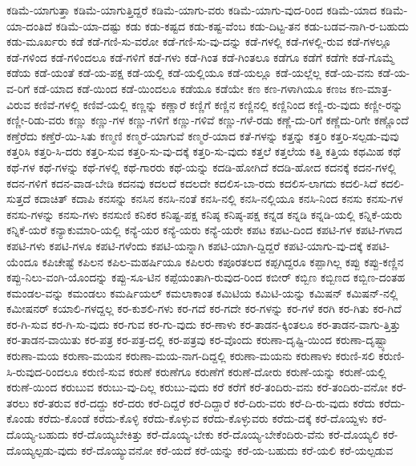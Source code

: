 {ಕಡಿಮೆ-ಯಾಗುತ್ತಾ
ಕಡಿಮೆ-ಯಾಗುತ್ತಿದ್ದರೆ
ಕಡಿಮೆ-ಯಾಗು-ವರು
ಕಡಿಮೆ-ಯಾಗು-ವುದ-ರಿಂದ
ಕಡಿಮೆ-ಯಾದ
ಕಡಿಮೆ-ಯಾ-ದಂತಿದೆ
ಕಡಿಮೆ-ಯಾ-ದಷ್ಟು
ಕಡು
ಕಡು-ಕಷ್ಟದ
ಕಡು-ಕಷ್ಟ-ವೆಂಬ
ಕಡು-ದಿಟ್ಟ-ತನ
ಕಡು-ಬಡವ-ನಾಗಿ-ರ-ಬಹುದು
ಕಡು-ಮೂರ್ಖರು
ಕಡೆ
ಕಡೆ-ಗಣಿ-ಸು-ವರೋ
ಕಡೆ-ಗಣಿ-ಸು-ವು-ದನ್ನು
ಕಡೆ-ಗಳಲ್ಲಿ
ಕಡೆ-ಗಳಲ್ಲಿ-ರುವ
ಕಡೆ-ಗಳಲ್ಲೂ
ಕಡೆ-ಗಳಿಂದ
ಕಡೆ-ಗಳಿಂದಲೂ
ಕಡೆ-ಗಳಿಗೆ
ಕಡೆ-ಗಳು
ಕಡೆ-ಗಿಂತ
ಕಡೆ-ಗಿಂತಲೂ
ಕಡೆಗೂ
ಕಡೆಗೆ
ಕಡೆಗೇ
ಕಡೆ-ಗೊಮ್ಮೆ
ಕಡೆಯ
ಕಡೆ-ಯಂತೆ
ಕಡೆ-ಯ-ಪಕ್ಷ
ಕಡೆ-ಯಲ್ಲಿ
ಕಡೆ-ಯಲ್ಲಿಯೂ
ಕಡೆ-ಯಲ್ಲೂ
ಕಡೆ-ಯಲ್ಲೆಲ್ಲ
ಕಡೆ-ಯ-ವನು
ಕಡೆ-ಯ-ವ-ರಿಗೆ
ಕಡೆ-ಯಾದ
ಕಡೆ-ಯಿಂದ
ಕಡೆ-ಯಿಂದಲೂ
ಕಡೆಯೂ
ಕಡೆಯೇ
ಕಣ
ಕಣ-ಗಳಾಗಿಯೂ
ಕಣಜ
ಕಣ-ಮಾತ್ರ-ವಿರುವ
ಕಣಿವೆ-ಗಳಲ್ಲಿ
ಕಣಿವೆ-ಯಲ್ಲಿ
ಕಣ್ಣನ್ನು
ಕಣ್ಣಾರೆ
ಕಣ್ಣಿಗೆ
ಕಣ್ಣಿನ
ಕಣ್ಣಿನಲ್ಲಿ
ಕಣ್ಣಿನಿಂದ
ಕಣ್ಣಿ-ರು-ವುದು
ಕಣ್ಣೀ-ರನ್ನು
ಕಣ್ಣೀ-ರಿಡು-ವರು
ಕಣ್ಣು
ಕಣ್ಣು-ಗಳ
ಕಣ್ಣು-ಗಳಿಗೆ
ಕಣ್ಣು-ಗಳಿವೆ
ಕಣ್ಣು-ಗಳೆ-ರಡು
ಕಣ್ಣೆ-ದು-ರಿಗೆ
ಕಣ್ಣೆದು-ರಿಗೇ
ಕಣ್ಣೊಂದೆ
ಕಣ್ತೆರೆದು
ಕಣ್ತೆರೆ-ಯಿ-ಸಿತು
ಕಣ್ಮಣಿ
ಕಣ್ಮರೆ-ಯಾಗುವೆ
ಕಣ್ಮರೆ-ಯಾದ
ಕತೆ-ಗಳನ್ನು
ಕತ್ತನ್ನು
ಕತ್ತರಿ
ಕತ್ತರಿ-ಸಲ್ಪಡು-ವುವು
ಕತ್ತರಿಸಿ
ಕತ್ತರಿ-ಸಿ-ದರು
ಕತ್ತರಿ-ಸುವ
ಕತ್ತರಿ-ಸು-ವು-ದಕ್ಕೆ
ಕತ್ತರಿ-ಸು-ವುದು
ಕತ್ತಲೆ
ಕತ್ತಲೆಯ
ಕತ್ತಿ
ಕತ್ತಿಯ
ಕಥಮಿಹ
ಕಥೆ
ಕಥೆ-ಗಳ
ಕಥೆ-ಗಳನ್ನು
ಕಥೆ-ಗಳಲ್ಲಿ
ಕಥೆ-ಗಾರರು
ಕಥೆ-ಯನ್ನು
ಕದಡಿ-ಹೋಗಿದೆ
ಕದಡಿ-ಹೋದ
ಕದನಕ್ಕೆ
ಕದನ-ಗಳಲ್ಲಿ
ಕದನ-ಗಳಿಗೆ
ಕದನ-ವಾಡ-ಬೇಡಿ
ಕದನವು
ಕದಲದೆ
ಕದಲದೇ
ಕದಲಿಸ-ಬಾ-ರದು
ಕದಲಿಸ-ಲಾಗದು
ಕದಲಿ-ಸಿದೆ
ಕದಲಿ-ಸುತ್ತದೆ
ಕದಾಚಿತ್
ಕದಾಪಿ
ಕನಸನ್ನು
ಕನಸಿನ
ಕನಸಿ-ನಂತೆ
ಕನಸಿ-ನಲ್ಲಿ
ಕನಸಿ-ನಲ್ಲಿಯೂ
ಕನಸಿ-ನಿಂದ
ಕನಸು
ಕನಸು-ಗಳ
ಕನಸು-ಗಳನ್ನು
ಕನಸು-ಗಳು
ಕನಸುಣಿ
ಕನಿಕರ
ಕನಿಷ್ಟ-ಪಕ್ಷ
ಕನಿಷ್ಠ
ಕನಿಷ್ಠ-ಪಕ್ಷ
ಕನ್ನಡ
ಕನ್ನಡಿ
ಕನ್ನಡಿ-ಯಲ್ಲಿ
ಕನ್ನಿಕೆ-ಯರು
ಕನ್ನಿಕೆ-ಯರೆ
ಕನ್ಯಾಕುಮಾರಿ-ಯಲ್ಲಿ
ಕನ್ಯೆ-ಯರ
ಕನ್ಯೆ-ಯರು
ಕನ್ಯೆ-ಯರೇ
ಕಪಟ
ಕಪಟ-ದಿಂದ
ಕಪಟಿ-ಗಳ
ಕಪಟಿ-ಗಳಾದ
ಕಪಟಿ-ಗಳು
ಕಪಟಿ-ಗಳೂ
ಕಪಟಿ-ಗಳೆಂದು
ಕಪಟಿ-ಯನ್ನಾಗಿ
ಕಪಟಿ-ಯಾಗಿ-ದ್ದಿದ್ದರೆ
ಕಪಟಿ-ಯಾಗು-ವು-ದಕ್ಕೆ
ಕಪಟಿ-ಯೆಂದೂ
ಕಪಿಚೇಷ್ಟೆ
ಕಪಿಲನ
ಕಪಿಲ-ಮಹರ್ಷಿಯೂ
ಕಪಿಲರು
ಕಪೂರತಲದ
ಕಪ್ಪಗಿದ್ದರೂ
ಕಪ್ಪಾಗಿಲ್ಲ
ಕಪ್ಪು
ಕಪ್ಪು-ಕಣ್ಣಿನ
ಕಪ್ಪು-ನಿಲು-ವಂಗಿ-ಯೊಂದನ್ನು
ಕಪ್ಪು-ಸೂ-ಟಿನ
ಕಪ್ಪೆಯಂತಾಗಿ-ರುವುದ-ರಿಂದ
ಕಬೀರ್
ಕಬ್ಬಿಣ
ಕಬ್ಬಿಣದ
ಕಬ್ಬಿಣ-ದಂತಹ
ಕಮಂಡಲ-ವನ್ನು
ಕಮಂಡಲು
ಕಮರ್ಷಿಯಲ್
ಕಮಲಾಕಾಂತ
ಕಮಿಟಿಯ
ಕಮಿಟಿ-ಯನ್ನು
ಕಮಿಷನ್
ಕಮಿಷನ್-ನಲ್ಲಿ
ಕಮೀಷನರ್
ಕಯಾಲಿ-ಗಳದ್ದಲ್ಲ
ಕರ-ಕುಶಲಿ-ಗಳು
ಕರ-ಗದೆ
ಕರ-ಗದೇ
ಕರ-ಗಳನ್ನು
ಕರ-ಗಳೆ
ಕರಗಿ
ಕರ-ಗಿತು
ಕರ-ಗಿದೆ
ಕರ-ಗಿ-ಸುವ
ಕರ-ಗಿ-ಸು-ವುದು
ಕರ-ಗುವ
ಕರ-ಗು-ವುದು
ಕರ-ಣಾಳು
ಕರ-ತಾಡನ-ಕ್ಕಿಂತಲೂ
ಕರ-ತಾಡನ-ವಾಗು-ತ್ತಿತ್ತು
ಕರ-ತಾಡನ-ವಾಯಿತು
ಕರ-ಪತ್ರ
ಕರ-ಪತ್ರ-ದಲ್ಲಿ
ಕರ-ಪತ್ರವು
ಕರ-ವೊಂದು
ಕರುಣಾ-ದೃಷ್ಟಿ-ಯಿಂದ
ಕರುಣಾ-ದೃಷ್ಟ್ಯಾ
ಕರುಣಾ-ಮಯ
ಕರುಣಾ-ಮಯನ
ಕರುಣಾ-ಮಯ-ನಾಗ-ದಿದ್ದಲ್ಲಿ
ಕರುಣಾ-ಮಯನು
ಕರುಣಾಳು
ಕರುಣಿ-ಸಲಿ
ಕರುಣಿ-ಸಿ-ರುವುದ-ರಿಂದಲೂ
ಕರುಣಿ-ಸುವ
ಕರುಣೆ
ಕರುಣೆಗೂ
ಕರುಣೆಗೆ
ಕರುಣೆ-ದೋರು
ಕರುಣೆ-ಯನ್ನು
ಕರುಣೆ-ಯಲ್ಲಿ
ಕರುಣೆ-ಯಿಂದ
ಕರುಬುವ
ಕರುಬು-ವು-ದಿಲ್ಲ
ಕರುಬು-ವುದು
ಕರೆ
ಕರೆಗೆ
ಕರೆ-ತಂದಿರು-ವನು
ಕರೆ-ತಂದಿರು-ವನೋ
ಕರೆ-ತರಲು
ಕರೆ-ತರುವ
ಕರೆ-ದದ್ದು
ಕರೆ-ದರು
ಕರೆ-ದಿದ್ದರೆ
ಕರೆ-ದಿದ್ದಾರೆ
ಕರೆ-ದಿರು-ವರು
ಕರೆ-ದಿ-ರು-ವುದು
ಕರೆದು
ಕರೆದು-ಕೊಂಡು
ಕರೆದು-ಕೊಂಡೆ
ಕರೆದು-ಕೊಳ್ಳಿ
ಕರೆದು-ಕೊಳ್ಳುವ
ಕರೆದು-ಕೊಳ್ಳುವರು
ಕರೆದು-ದಕ್ಕೆ
ಕರೆ-ದೊಯ್ದಳು
ಕರೆ-ದೊಯ್ಯ-ಬಹುದು
ಕರೆ-ದೊಯ್ಯಬೇಕಿತ್ತು
ಕರೆ-ದೊಯ್ಯ-ಬೇಕು
ಕರೆ-ದೊಯ್ಯ-ಬೇಕೆಂದಿರು-ವೆನು
ಕರೆ-ದೊಯ್ಯಲಿ
ಕರೆ-ದೊಯ್ಯಲ್ಪಡು-ವುದು
ಕರೆ-ದೊಯ್ಯುವನೋ
ಕರೆ-ಯದೆ
ಕರೆ-ಯನ್ನು
ಕರೆ-ಯ-ಬಹುದು
ಕರೆ-ಯಲಿ
ಕರೆ-ಯಲ್ಪಡುವ
}
